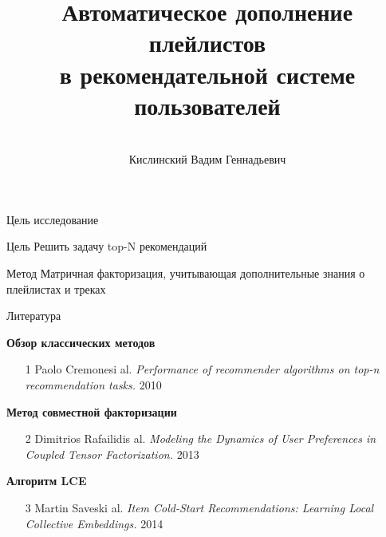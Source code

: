 \documentclass{beamer}
\title[\hbox to 56mm{Автоматическое дополнение плейлистов  \hfill\insertframenumber\,/\,\inserttotalframenumber}]
{Автоматическое дополнение плейлистов \\ в рекомендательной системе пользователей}
\author[В.\,Г. Кислинский]{\large \\Кислинский Вадим Геннадьевич}
\institute{\large
Московский физико-технический институт}
\date{\footnotesize{\emph{Курс:} Численные методы обучения по прецедентам\par (практика, В.\,В. Стрижов)/Группа 574, весна 2018}}
\begin{document}
\begin{frame}
\titlepage
\end{frame}
\begin{frame}{Цель исследование}

\begin{block}{Цель}
Решить задачу top-N рекомендаций
\end{block}

\begin{block}{Метод}
Матричная факторизация, учитывающая дополнительные знания о плейлистах и треках
\end{block}
\end{frame}
\begin{frame}{Литература}

{\bf Обзор классических методов}
\begin{enumerate}
\item[1] Paolo Cremonesi al. \textit{Performance of recommender algorithms on top-n recommendation tasks.} 2010
\end{enumerate}
{\bf Метод совместной факторизации}
\begin{enumerate}
\item[2] 	Dimitrios Rafailidis al. \textit{Modeling the Dynamics of User Preferences in Coupled Tensor Factorization.}  2013
\end{enumerate}
{\bf Алгоритм LCE}
\begin{enumerate}
\item[3]Martin Saveski al. \textit{ Item Cold-Start Recommendations:
Learning Local Collective Embeddings.} 2014
\end{enumerate}
\end{frame}
\end{document}
